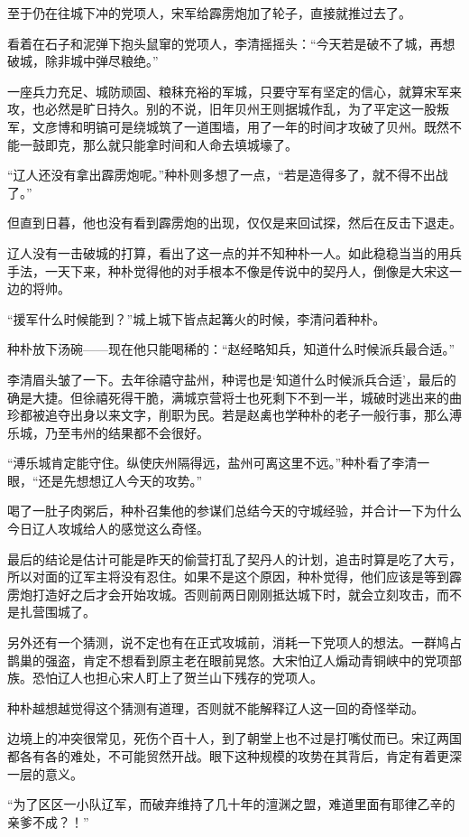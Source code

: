 至于仍在往城下冲的党项人，宋军给霹雳炮加了轮子，直接就推过去了。 

看着在石子和泥弹下抱头鼠窜的党项人，李清摇摇头：“今天若是破不了城，再想破城，除非城中弹尽粮绝。” 

一座兵力充足、城防顽固、粮秣充裕的军城，只要守军有坚定的信心，就算宋军来攻，也必然是旷日持久。别的不说，旧年贝州王则据城作乱，为了平定这一股叛军，文彦博和明镐可是绕城筑了一道围墙，用了一年的时间才攻破了贝州。既然不能一鼓即克，那么就只能拿时间和人命去填城壕了。 

“辽人还没有拿出霹雳炮呢。”种朴则多想了一点，“若是造得多了，就不得不出战了。” 

但直到日暮，他也没有看到霹雳炮的出现，仅仅是来回试探，然后在反击下退走。 

辽人没有一击破城的打算，看出了这一点的并不知种朴一人。如此稳稳当当的用兵手法，一天下来，种朴觉得他的对手根本不像是传说中的契丹人，倒像是大宋这一边的将帅。 

“援军什么时候能到？”城上城下皆点起篝火的时候，李清问着种朴。 

种朴放下汤碗——现在他只能喝稀的：“赵经略知兵，知道什么时候派兵最合适。” 

李清眉头皱了一下。去年徐禧守盐州，种谔也是‘知道什么时候派兵合适’，最后的确是大捷。但徐禧死得干脆，满城京营将士也死剩下不到一半，城破时逃出来的曲珍都被追夺出身以来文字，削职为民。若是赵禼也学种朴的老子一般行事，那么溥乐城，乃至韦州的结果都不会很好。 

“溥乐城肯定能守住。纵使庆州隔得远，盐州可离这里不远。”种朴看了李清一眼，“还是先想想辽人今天的攻势。” 

喝了一肚子肉粥后，种朴召集他的参谋们总结今天的守城经验，并合计一下为什么今日辽人攻城给人的感觉这么奇怪。 

最后的结论是估计可能是昨天的偷营打乱了契丹人的计划，追击时算是吃了大亏，所以对面的辽军主将没有忍住。如果不是这个原因，种朴觉得，他们应该是等到霹雳炮打造好之后才会开始攻城。否则前两日刚刚抵达城下时，就会立刻攻击，而不是扎营围城了。 

另外还有一个猜测，说不定也有在正式攻城前，消耗一下党项人的想法。一群鸠占鹊巢的强盗，肯定不想看到原主老在眼前晃悠。大宋怕辽人煽动青铜峡中的党项部族。恐怕辽人也担心宋人盯上了贺兰山下残存的党项人。 

种朴越想越觉得这个猜测有道理，否则就不能解释辽人这一回的奇怪举动。 

边境上的冲突很常见，死伤个百十人，到了朝堂上也不过是打嘴仗而已。宋辽两国都各有各的难处，不可能贸然开战。眼下这种规模的攻势在其背后，肯定有着更深一层的意义。 

“为了区区一小队辽军，而破弃维持了几十年的澶渊之盟，难道里面有耶律乙辛的亲爹不成？！” 

